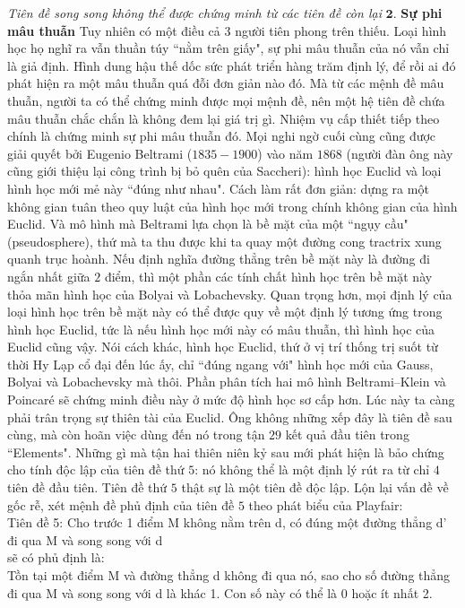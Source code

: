 \begin{multicols}{2}
	\vskip 0.1cm
	\textit{Tiên đề song song không thể được chứng minh từ các tiên đề còn lại} 
	\vskip 0.1cm
	$\pmb{2.}$ \textbf{\color{lichsutoanhoc}Sự phi mâu thuẫn}
	\vskip 0.1cm
	Tuy nhiên có một điều cả $3$ người tiên phong trên thiếu. Loại hình học họ nghĩ ra vẫn thuần túy ``nằm trên giấy", sự phi mâu thuẫn của nó vẫn chỉ là giả định. Hình dung hậu thế dốc sức phát triển hàng trăm định lý, để rồi ai đó phát hiện ra một mâu thuẫn quá đỗi đơn giản nào đó. Mà từ các mệnh đề mâu thuẫn, người ta có thể chứng minh được mọi mệnh đề, nên một hệ tiên đề chứa mâu thuẫn chắc chắn là không đem lại giá trị gì. Nhiệm vụ cấp thiết tiếp theo chính là chứng minh sự phi mâu thuẫn đó.
	\vskip 0.1cm
	Mọi nghi ngờ cuối cùng cũng được giải quyết bởi Eugenio Beltrami ($1835-1900$) vào năm $1868$ (người đàn ông này cũng giới thiệu lại công trình bị bỏ quên của Saccheri): hình học Euclid và loại hình học mới mẻ này ``đúng như nhau". 
	\vskip 0.1cm
	Cách làm rất đơn giản: dựng ra một không gian tuân theo quy luật của hình học mới trong chính không gian của hình Euclid. Và mô hình mà Beltrami lựa chọn là bề mặt của một ``ngụy cầu" (pseudosphere), thứ mà ta thu được khi ta quay một đường cong tractrix xung quanh trục hoành. Nếu định nghĩa đường thẳng trên bề mặt này là đường đi ngắn nhất giữa $2$ điểm, thì một phần các tính chất hình học trên bề mặt này thỏa mãn hình học của Bolyai và Lobachevsky. 
	\vskip 0.1cm
	Quan trọng hơn, mọi định lý của loại hình học trên bề mặt này có thể được quy về một định lý tương ứng trong hình học Euclid, tức là nếu hình học mới này có mâu thuẫn, thì hình học của Euclid cũng vậy. Nói cách khác, hình học Euclid, thứ ở vị trí thống trị suốt từ thời Hy Lạp cổ đại đến lúc ấy, chỉ ``đúng ngang với" hình học mới của Gauss, Bolyai và Lobachevsky mà thôi. Phần phân tích hai mô hình Beltrami--Klein và Poincaré sẽ chứng minh điều này ở mức độ hình học sơ cấp hơn.
	\vskip 0.1cm
	Lúc này ta càng phải trân trọng sự thiên tài của Euclid. Ông không những xếp đây là tiên đề sau cùng, mà còn hoãn việc dùng đến nó trong tận $29$ kết quả đầu tiên trong ``Elements". Những gì mà tận hai thiên niên kỷ sau mới phát hiện là bảo chứng cho tính độc lập của tiên đề thứ $5$: nó không thể là một định lý rút ra từ chỉ $4$ tiên đề đầu tiên. Tiên đề thứ $5$ thật sự là một tiên đề độc lập.
	\vskip 0.1cm
	Lộn lại vấn đề về gốc rễ, xét mệnh đề phủ định của tiên đề $5$ theo phát biểu của Playfair: \\
	Tiên đề 5: Cho trước 1 điểm M không nằm trên d, có đúng một đường thẳng d’ đi qua M và song song với d \\
	sẽ có phủ định là: \\
	Tồn tại một điểm M và đường thẳng d không đi qua nó, sao cho số đường thẳng đi qua M và song song với d là khác 1. Con số này có thể là 0 hoặc ít nhất 2. 
	

\end{multicols}
